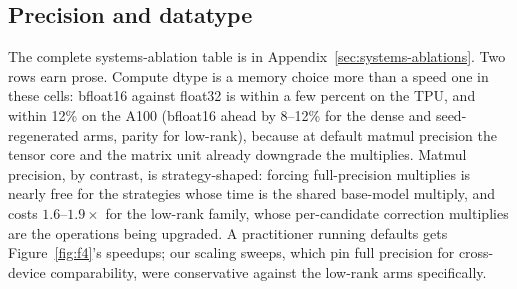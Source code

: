 \subsection{Precision and datatype}
The complete systems-ablation table is in
Appendix~\ref{sec:systems-ablations}.
Two rows earn prose. Compute dtype is a memory choice more than a speed
one in these cells: bfloat16 against float32 is within a few percent on
the TPU, and within 12\% on the A100 (bfloat16 ahead by 8--12\% for the
dense and seed-regenerated arms, parity for low-rank), because at default
matmul precision the tensor core and the matrix unit already downgrade
the multiplies. Matmul
precision, by contrast, is strategy-shaped: forcing full-precision
multiplies is nearly free for the strategies whose time is the shared
base-model multiply, and costs $1.6$--$1.9\times$ for the low-rank
family, whose per-candidate correction multiplies are the operations being
upgraded. A practitioner running defaults gets Figure~\ref{fig:f4}'s
speedups; our scaling sweeps, which pin full precision for cross-device
comparability, were conservative against the low-rank arms specifically.
